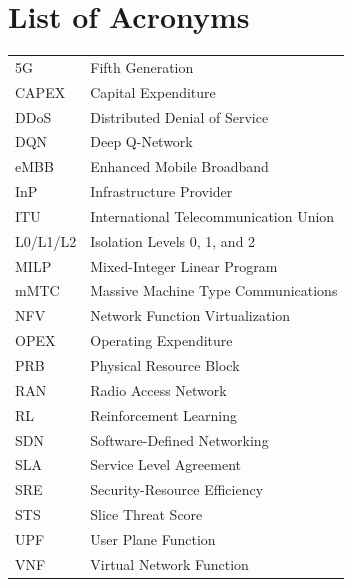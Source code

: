 \chapter*{List of Acronyms}
\begin{longtable}{ll}
5G & Fifth Generation\\
CAPEX & Capital Expenditure\\
DDoS & Distributed Denial of Service\\
DQN & Deep Q-Network\\
eMBB & Enhanced Mobile Broadband\\
InP & Infrastructure Provider\\
ITU & International Telecommunication Union\\
L0/L1/L2 & Isolation Levels 0, 1, and 2\\
MILP & Mixed-Integer Linear Program\\
mMTC & Massive Machine Type Communications\\
NFV & Network Function Virtualization\\
OPEX & Operating Expenditure\\
PRB & Physical Resource Block\\
RAN & Radio Access Network\\
RL & Reinforcement Learning\\
SDN & Software-Defined Networking\\
SLA & Service Level Agreement\\
SRE & Security-Resource Efficiency\\
STS & Slice Threat Score\\
UPF & User Plane Function\\
VNF & Virtual Network Function\\
\end{longtable}
